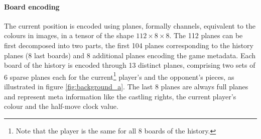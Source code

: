 

\paragraph{Board encoding}
The current position is encoded using planes, formally channels, equivalent to the colours in images, in a tensor of the shape $112\times8\times8$. The 112 planes can be first decomposed into two parts, the first 104 planes corresponding to the history planes (8 last boards) and 8 additional planes encoding the game metadata.
Each board of the history is encoded through 13 distinct planes, comprising two sets of 6 sparse planes each for the current\footnote{Note that the player is the same for all 8 boards of the history.}
player's and the opponent's pieces, as illustrated in figure \ref{fig:background_a}.
The last 8 planes are always full planes and represent meta information like the castling rights, the current player's colour and the half-move clock value.


